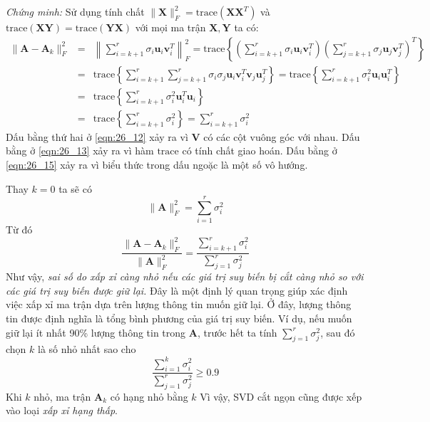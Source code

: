 \textit{Chứng minh:} Sử dụng tính chất $\|\mathbf{X}\|_F^2 = \text{trace}(\mathbf{X}\mathbf{X}^T)$ và
$\text{trace}(\mathbf{XY}) = \text{trace}(\mathbf{YX})$ với mọi ma trận
$\mathbf{X, Y}$ ta có:
\begin{eqnarray}
\nonumber
\|\mathbf{A} - \mathbf{A}_k\|_F^2 & = & \left\|\sum_{i = k + 1}^r \sigma_i
\mathbf{u}_i\mathbf{v}_i^T \right\|_F^2
=  \text{trace}\left\{ \left(\sum_{i = k + 1}^r \sigma_i \mathbf{u}_i\mathbf{v}_i^T\right)
\left(\sum_{j = k + 1}^r \sigma_j \mathbf{u}_j\mathbf{v}_j^T\right)^T
\right\}  \\\
\label{eqn:26_12}
&=& \text{trace}\left\{ \sum_{i = k + 1}^r \sum_{j = k + 1}^r \sigma_i\sigma_j \mathbf{u}_i\mathbf{v}_i^T \mathbf{v}_j \mathbf{u}_j^T
\right\}
= \text{trace}\left\{ \sum_{i = k + 1}^r  \sigma_i^2\mathbf{u}_i\mathbf{u}_i^T
\right\} \\\
\label{eqn:26_13}
&=& \text{trace}\left\{ \sum_{i = k + 1}^r  \sigma_i^2\mathbf{u}_i^T\mathbf{u}_i
\right\}  \\\
\label{eqn:26_15}
&=& \text{trace}\left\{ \sum_{i = k + 1}^r  \sigma_i^2
\right\}  = \sum_{i = k + 1}^r \sigma_i^2
\end{eqnarray}
Dấu bằng thứ hai ở \eqref{eqn:26_12} xảy ra vì $\mathbf{V}$ có các cột vuông góc với nhau.
Dấu bằng ở \eqref{eqn:26_13} xảy ra vì hàm $\text{trace}$ có tính chất giao hoán.
Dấu bằng ở \eqref{eqn:26_15} xảy ra vì biểu thức trong dấu ngoặc là một số vô hướng. \dpcm

Thay $k = 0$ ta sẽ có
\begin{equation}
\label{eqn:26_16}
\|\mathbf{A}\|_F^2 = \sum_{i = 1}^r \sigma_i^2
\end{equation}
Từ đó
\begin{equation}
\label{eqn:26_17}
\frac{\|\mathbf{A} - \mathbf{A}_k\|_F^2}{\|\mathbf{A}\|_F^2} = {\frac{\sum_{i =
k + 1}^r \sigma_i^2}{\sum_{j = 1}^r \sigma_j^2}}
\end{equation}
Như vậy, \textit{sai số do xấp xỉ càng nhỏ nếu các giá trị suy biến bị
cắt càng nhỏ so với các giá trị suy biến được giữ lại.}
Đây là một định lý quan trọng giúp xác định việc xấp xỉ ma trận dựa trên lượng
thông tin muốn giữ lại. Ở đây, {lượng thông tin} được định nghĩa
là tổng bình phương của giá trị suy biến. Ví dụ, nếu muốn giữ lại ít nhất
90\% lượng thông tin trong $\mathbf{A}$, trước hết ta tính $\sum_{j = 1}^r
\sigma_j^2$, sau đó chọn $k$ là số nhỏ nhất sao cho
\begin{equation}
\frac{\sum_{i = 1}^k \sigma_i^2}{\sum_{j = 1}^r \sigma_j^2} \geq 0.9
\end{equation}
Khi $k$ nhỏ, ma trận $\mathbf{A}_k$ có hạng nhỏ bằng $k$
Vì vậy, SVD cắt ngọn cũng được xếp vào loại \textit{xấp xỉ hạng thấp}.


